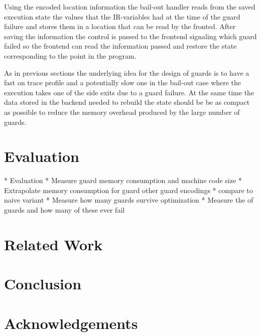 \documentclass[10pt]{sigplanconf}
\newcommand\bivab[1]{\nb{DAVID}{#1}}
\begin{document}
Using the encoded location information the bail-out handler reads from the
saved execution state the values that the IR-variables had  at the time of the
guard failure and stores them in a location that can be read by the fronted.
After saving the information the control is passed to the frontend signaling
which guard failed so the frontend can read the information passed and restore
the state corresponding to the point in the program.

As in previous sections the underlying idea for the design of guards is to have
a fast on trace profile and a potentially slow one in the bail-out case where
the execution takes one of the side exits due to a guard failure. At the same
time the data stored in the backend needed to rebuild the state should be be
as compact as possible to reduce the memory overhead produced by the large
number of guards\bivab{back this}.

%



\section{Evaluation}
\label{sec:evaluation}

* Evaluation
   * Measure guard memory consumption and machine code size
   * Extrapolate memory consumption for guard other guard encodings
      * compare to naive variant
   * Measure how many guards survive optimization
   * Measure the of guards and how many of these ever fail

\section{Related Work}


\section{Conclusion}


\section*{Acknowledgements}



\end{document}
